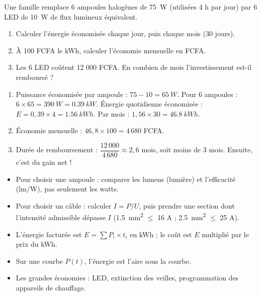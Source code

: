 \documentclass[11pt]{article}
\newcommand{\cle}[1]{{\popxbold\color{popdark}#1}}
\begin{document}
\begin{exercice}
Une famille remplace 6 ampoules halogènes de \SI{75}{W} (utilisées 4 h par jour) par 6 LED de \SI{10}{W} de flux lumineux équivalent.
\begin{enumerate}
\item Calculer l'énergie économisée chaque jour, puis chaque mois (30 jours).
\item À 100 FCFA le kWh, calculer l'économie mensuelle en FCFA.
\item Les 6 LED coûtent 12 000 FCFA. En combien de mois l'investissement est-il remboursé ?
\end{enumerate}
\end{exercice}

\begin{corrige}
\begin{enumerate}
\item Puissance économisée par ampoule : $75 - 10 = \SI{65}{W}$. Pour 6 ampoules : $6 \times 65 = \SI{390}{W} = \SI{0,39}{kW}$. Énergie quotidienne économisée : $E = 0{,}39 \times 4 = \SI{1,56}{kWh}$. Par mois : $1{,}56 \times 30 = \SI{46,8}{kWh}$.
\item Économie mensuelle : $46{,}8 \times 100 = 4\,680$ FCFA.
\item Durée de remboursement : $\dfrac{12\,000}{4\,680} \approx 2{,}6$ mois, soit moins de 3 mois. Ensuite, c'est du gain net !
\end{enumerate}
\end{corrige}

\begin{aretenir}
\begin{itemize}
\item Pour choisir une ampoule : comparer les \cle{lumens} (lumière) et l'\cle{efficacité} (lm/W), pas seulement les watts.
\item Pour choisir un câble : calculer $I = P/U$, puis prendre une section dont l'intensité admissible dépasse $I$ (\SI{1,5}{mm^2} $\leq$ 16 A ; \SI{2,5}{mm^2} $\leq$ 25 A).
\item L'énergie facturée est $E = \sum P_i \times t_i$ en kWh ; le coût est $E$ multiplié par le prix du kWh.
\item Sur une courbe $P(t)$, l'énergie est l'aire sous la courbe.
\item Les grandes économies : LED, extinction des veilles, programmation des appareils de chauffage.
\end{itemize}
\end{aretenir}
\end{document}
